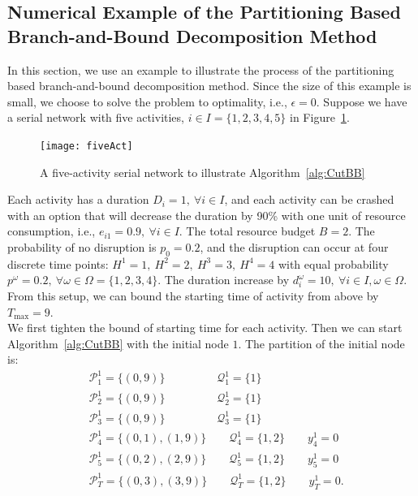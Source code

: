 \documentclass[11pt]{article}
\newcommand{\noi}{\noindent}
\begin{document}
	\subsection{Numerical Example of the Partitioning Based Branch-and-Bound Decomposition Method}
	In this section, we use an example to illustrate the process of the partitioning based branch-and-bound decomposition method. Since the size of this example is small, we choose to solve the problem to optimality, i.e., \(\epsilon = 0\). Suppose we have a serial network with five activities, \(i \in I = \{1,2,3,4,5\}\) in Figure~\ref{fig:fiveAct}. 
	\begin{figure}[H]
		\centering
		\texttt{[image: fiveAct]}
		\caption{A five-activity serial network to illustrate Algorithm~\ref{alg:CutBB}}
		\label{fig:fiveAct}
	\end{figure}
	\noi Each activity has a duration \(D_i = 1,\ \forall i \in I\), and each activity can be crashed with an option that will decrease the duration by 90\% with one unit of resource consumption, i.e., \(e_{i1} = 0.9,\ \forall i \in I\). The total resource budget \(B = 2\). The probability of no disruption is \(p_0 = 0.2\), and the disruption can occur at four discrete time points: \(H^1 = 1,\ H^2 = 2,\ H^3 = 3,\ H^4 = 4\) with equal probability \(p^\omega = 0.2,\ \forall \omega \in \Omega = \{1,2,3,4\}\). The duration increase by \(d_i^\omega = 10,\ \forall i \in I, \omega \in \Omega\). From this setup, we can bound the starting time of activity from above by \(T_{\max} = 9\). \\
	\newline
	We first tighten the bound of starting time for each activity. Then we can start Algorithm~\ref{alg:CutBB} with the initial node \(1\). The partition of the initial node is:
	\begin{align*}
	&\mathcal{P}_1^1 = \{(0,9)\} \qquad \qquad \;\; \mathcal{Q}_1^1 = \{1\}\\
	&\mathcal{P}_2^1 = \{(0,9)\} \qquad \qquad \;\; \mathcal{Q}_2^1 = \{1\}\\
	&\mathcal{P}_3^1 = \{(0,9)\} \qquad \qquad \;\; \mathcal{Q}_3^1 = \{1\}\\
	&\mathcal{P}_4^1 = \{(0,1),(1,9)\} \qquad  \mathcal{Q}_4^1 = \{1,2\} \qquad y_4^1 = 0\\
	&\mathcal{P}_5^1 = \{(0,2),(2,9)\} \qquad  \mathcal{Q}_5^1 = \{1,2\} \qquad y_5^1 = 0\\
	&\mathcal{P}_T^1 = \{(0,3),(3,9)\} \qquad  \mathcal{Q}_T^1 = \{1,2\} \qquad y_T^1 = 0.
	\end{align*}
\end{document}
